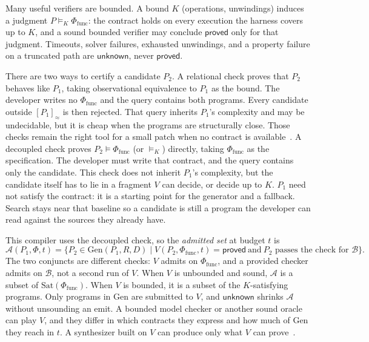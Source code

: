 Many useful verifiers are bounded. A bound \(K\) (operations, unwindings)
induces a judgment \(P \models_K \Phi_{\text{func}}\): the contract holds on
every execution the harness covers up to \(K\), and a sound bounded verifier
may conclude \(\mathsf{proved}\) only for that judgment. Timeouts, solver
failures, exhausted unwindings, and a property failure on a truncated path
are \(\mathsf{unknown}\), never \(\mathsf{proved}\).

There are two ways to certify a candidate \(P_2\). A relational check proves
that \(P_2\) behaves like \(P_1\), taking observational equivalence to
\(P_1\) as the bound. The
developer writes no \(\Phi_{\text{func}}\) and the query contains both
programs. Every candidate outside \([P_1]_\approx\) is then rejected.
That query inherits
\(P_1\)'s complexity and may be undecidable, but it is cheap when the
programs are structurally close. Those checks remain the right tool for a
small patch when no contract is available~\cite{lopes2021alive2}. A
decoupled check proves \(P_2 \models \Phi_{\text{func}}\) (or
\(\models_K\)) directly, taking \(\Phi_{\text{func}}\) as the
specification. The developer must write that contract, and the query
contains only the candidate. This check does not inherit \(P_1\)'s complexity, but the
candidate itself has to lie in a fragment \(V\) can decide, or decide up to
\(K\). \(P_1\) need not satisfy the contract: it is a starting point for the
generator and a fallback. Search stays near that baseline so a candidate is
still a program the developer can read against the sources they already
have.

This compiler uses the decoupled check, so the \emph{admitted set} at budget
\(t\) is
\[
\mathcal{A}(P_1, \Phi, t)
= \{ P_2 \in \mathrm{Gen}(P_1, R, D) \mid
V(P_2, \Phi_{\text{func}}, t) = \mathsf{proved}
\ \text{and}\ P_2 \text{ passes the check for }\mathcal{B} \}.
\]
The two conjuncts are different checks: \(V\) admits on \(\Phi_{\text{func}}\),
and a provided checker admits on \(\mathcal{B}\), not a second run of \(V\).
When \(V\) is unbounded and sound, \(\mathcal{A}\) is a subset of
\(\mathrm{Sat}(\Phi_{\text{func}})\). When \(V\) is bounded, it is a subset
of the \(K\)-satisfying programs. Only programs in \(\mathrm{Gen}\) are
submitted to \(V\), and \(\mathsf{unknown}\) shrinks \(\mathcal{A}\) without
unsounding an emit. A
bounded model checker or another sound oracle can play \(V\), and they
differ in which contracts they express and how much of \(\mathrm{Gen}\) they
reach in \(t\). A synthesizer built on \(V\) can produce only what \(V\) can
prove~\cite{Srivastava2010VS3}.

